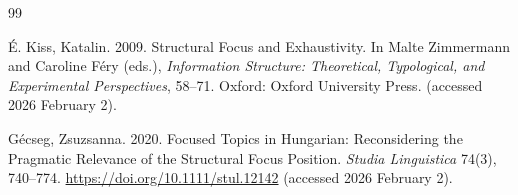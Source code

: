 \documentclass[a4paper, ruler]{CUP-JNL-LIN}%
\begin{document}
\begin{Backmatter}
\begin{thebibliography}{99}

{É. Kiss, Katalin}. 2009. Structural Focus and Exhaustivity. In Malte Zimmermann and Caroline Féry (eds.), \textit{Information Structure: Theoretical, Typological, and Experimental Perspectives}, 58--71. Oxford: Oxford University Press. (accessed 2026 February 2).




{Gécseg, Zsuzsanna}. 2020. Focused Topics in Hungarian: Reconsidering the Pragmatic Relevance of the Structural Focus Position. \textit{Studia Linguistica} 74(3), 740--774. \url{https://doi.org/10.1111/stul.12142}  (accessed 2026 February 2).




\end{thebibliography}
\end{Backmatter}
\end{document}
